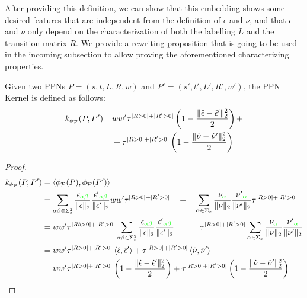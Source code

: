 After providing this definition, we can show that this embedding shows some desired features that are independent from the definition of $\epsilon$ and $\nu$, and that $\epsilon$ and $\nu$ only depend on the characterization of both the labelling $L$ and the transition matrix $R$. We provide a rewriting proposition that is going to be used in the incoming subsection to allow proving the aforementioned characterizing properties.

\begin{proposition}\label{lem:rewritinglemma}
Given two PPNs $P=(s,t,L,R,w)$ and $P'=(s',t',L',R',w')$, the PPN Kernel is defined as follows:
$$\begin{aligned}
k_{\phi_{\mathcal{P}}}(P,P')=&ww'\tau^{|R>0|+|R'>0|}\left(1-\frac{\|\hat{\epsilon}-\hat{\epsilon}'\|_{2}^2}{2}\right)+\\
	&+\tau^{|R>0|+|R'>0|}\left(1-\frac{\|\hat{\nu}-\hat{\nu}'\|_{2}^2}{2}\right)\\
\end{aligned}$$
\end{proposition}
\begin{proof}
$$\begin{aligned}
k_{\phi_{\mathcal{P}}}(P,P')&=\Braket{\phi_{\mathcal{P}}(P),\phi_{\mathcal{P}}(P')}\\
	&=\sum_{\alpha\beta\in \Sigma_\varepsilon^2}\frac{\epsilon_{\color{green}\alpha\beta}}{\|\epsilon\|_2}\frac{{\epsilon'}_{\color{green}\alpha\beta}}{\|\epsilon'\|_2}ww'\tau^{|R>0|+|R'>0|}\quad+\quad \sum_{\alpha\in \Sigma_\varepsilon}\frac{\nu_{\color{green}\alpha}}{\|\nu\|_2}\frac{{\nu'}_{\color{green}\alpha}}{\|\nu'\|_2}\tau^{|R>0|+|R'>0|}\\
	&=ww'\tau^{|Rb>0|+|R'>0|}\sum_{\alpha\beta\in \Sigma_\varepsilon^2}\frac{\epsilon_{\color{green}\alpha\beta}}{\|\epsilon\|_2}\frac{{\epsilon'}_{\color{green}\alpha\beta}}{\|\epsilon'\|_2}\quad+\quad \tau^{|R>0|+|R'>0|}\sum_{\alpha\in \Sigma_\varepsilon}\frac{\nu_{\color{green}\alpha}}{\|\nu\|_2}\frac{{\nu'}_{\color{green}\alpha}}{\|\nu'\|_2}\\
	&=ww'\tau^{|R>0|+|R'>0|}\Braket{\hat{\epsilon}, \hat{\epsilon}'}+ \tau^{|R>0|+|R'>0|}\Braket{\hat{\nu}, \hat{\nu}'}\\
	&=ww'\tau^{|R>0|+|R'>0|}\left(1-\frac{\|\hat{\epsilon}- \hat{\epsilon}'\|_{2}^2}{2}\right)+ \tau^{|R>0|+|R'>0|}\left(1-\frac{\|\hat{\nu}- \hat{\nu}'\|_{2}^2}{2}\right)\\
\end{aligned}$$
\end{proof}

